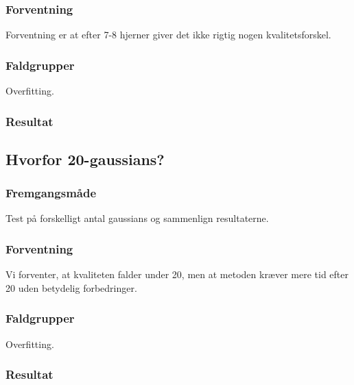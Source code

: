 \subsubsection{Forventning}
Forventning er at efter 7-8 hjerner giver det ikke rigtig nogen
kvalitetsforskel.

\subsubsection{Faldgrupper}
Overfitting. 


\subsubsection{Resultat}

\subsection{Hvorfor 20-gaussians?}

\subsubsection{Fremgangsmåde}
Test på forskelligt antal gaussians og sammenlign resultaterne.

\subsubsection{Forventning}
Vi forventer, at kvaliteten falder under 20, men at metoden kræver mere tid
efter 20 uden betydelig forbedringer.

\subsubsection{Faldgrupper}
Overfitting. 

\subsubsection{Resultat}



